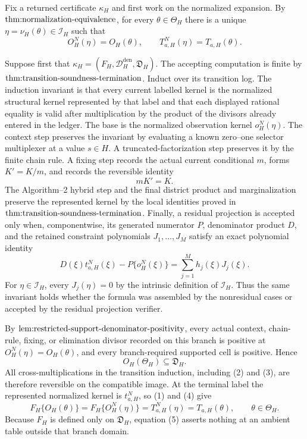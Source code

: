 Fix a returned certificate \(\kappa_H\) and first work on the normalized expansion.  By \(\textnormal{thm:normalization-equivalence}\), for every \(\theta\in\Theta_H\) there is a unique \(\eta=\nu_H(\theta)\in\mathcal I_H\) such that
\[
 O_H^N(\eta)=O_H(\theta),
 \qquad
 T_{a,H}^N(\eta)=T_{a,H}(\theta).
\tag{1}
\]

Suppose first that \(\kappa_H=(F_H,\mathcal D_H^{\mathrm{den}},\mathfrak D_H)\).  The accepting computation is finite by \(\textnormal{thm:transition-soundness-termination}\).  Induct over its transition log.  The induction invariant is that every current labelled kernel is the normalized structural kernel represented by that label and that each displayed rational equality is valid after multiplication by the product of the divisors already entered in the ledger.  The base is the normalized observation kernel \(o_H^N(\eta)\).  The context step preserves the invariant by evaluating a known zero--one selector multiplexer at a value \(s\in H\).  A truncated-factorization step preserves it by the finite chain rule.  A fixing step records the actual current conditional \(m\), forms \(K'=K/m\), and records the reversible identity
\[
 mK'=K.
\tag{2}
\]
The Algorithm--2 hybrid step and the final district product and marginalization preserve the represented kernel by the local identities proved in \(\textnormal{thm:transition-soundness-termination}\).  Finally, a residual projection is accepted only when, componentwise, its generated numerator \(P\), denominator product \(D\), and the retained constraint polynomials \(J_1,\ldots,J_M\) satisfy an exact polynomial identity
\[
 D(\xi)t_{a,H}^N(\xi)-P\{o_H^N(\xi)\}
 =\sum_{j=1}^M h_j(\xi)J_j(\xi).
\tag{3}
\]
For \(\eta\in\mathcal I_H\), every \(J_j(\eta)=0\) by the intrinsic definition of \(\mathcal I_H\).  Thus the same invariant holds whether the formula was assembled by the nonresidual cases or accepted by the residual projection verifier.

By \(\textnormal{lem:restricted-support-denominator-positivity}\), every actual context, chain-rule, fixing, or elimination divisor recorded on this branch is positive at \(O_H^N(\eta)=O_H(\theta)\), and every branch-required supported cell is positive.  Hence
\[
 O_H(\Theta_H)\subseteq\mathfrak D_H.
\tag{4}
\]
All cross-multiplications in the transition induction, including (2) and (3), are therefore reversible on the compatible image.  At the terminal label the represented normalized kernel is \(t_{a,H}^N\), so (1) and (4) give
\[
 F_H\{O_H(\theta)\}
 =F_H\{O_H^N(\eta)\}
 =T_{a,H}^N(\eta)
 =T_{a,H}(\theta),
 \qquad \theta\in\Theta_H.
\tag{5}
\]
Because \(F_H\) is defined only on \(\mathfrak D_H\), equation (5) asserts nothing at an ambient table outside that branch domain.

